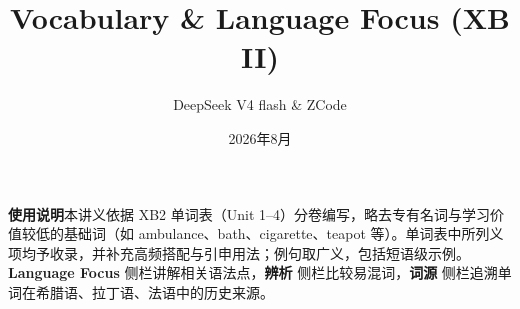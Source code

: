 \documentclass[12pt, a4paper]{ctexart}
\title{Vocabulary \& Language Focus (XB II)}
\author{DeepSeek V4 flash \& ZCode}
\date{2026年8月}
\begin{document}
\maketitle
\begin{cbox}
\textbf{使用说明}\quad 本讲义依据 XB2 单词表（Unit 1--4）分卷编写，略去专有名词与学习价值较低的基础词（如 ambulance、bath、cigarette、teapot 等）。单词表中所列义项均予收录，并补充高频搭配与引申用法；例句取广义，包括短语级示例。\textcolor{orange!80!black}{\textbf{Language Focus}} 侧栏讲解相关语法点，\textcolor{TealBlue}{\textbf{辨析}} 侧栏比较易混词，\textcolor{OliveGreen}{\textbf{词源}} 侧栏追溯单词在希腊语、拉丁语、法语中的历史来源。
\end{cbox}
\newpage

\tableofcontents
\newpage








\end{document}
